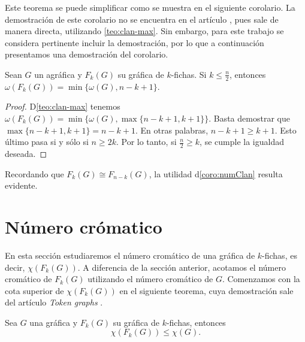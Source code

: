 Este teorema se puede simplificar como se muestra en el siguiente corolario. La
demostraci\'on de este corolario no se encuentra en el art\'iculo
\cite{fabilaToken}, pues sale de manera directa, utilizando \cref{teo:clan-max}.
Sin embargo, para este trabajo se considera pertinente incluir la
demostraci\'on, por lo que a continuaci\'on presentamos una demostraci\'on del
corolario.

\begin{corolario}
\label{coro:numClan}
    Sean $G$ un agr\'afica y $F_k(G)$ su gr\'afica de $k$-fichas. Si $k \leq
    \frac{n}{2}$, entonces $\omega(F_k(G))= \min\{\omega(G), n-k+1\}$.
\end{corolario}

\begin{proof}
    D\cref{teo:clan-max} tenemos $\omega(F_k(G))= \min \{\omega(G), \max
    \{n-k+1,k+1\}\}$. Basta demostrar que $\max \{n-k+1, k+1\} = n-k+1$. En
    otras palabras, 
    \linebreak
    $n-k+1 \geq k+1$. Esto \'ultimo pasa si y s\'olo si $n \geq
    2k$. Por lo tanto, si $\frac{n}{2} \geq k$, se cumple la igualdad deseada.
\end{proof}

Recordando que $F_k(G) \cong F_{n-k}(G)$, la utilidad  d\cref{coro:numClan}
resulta evidente. 

\section{N\'umero cr\'omatico}%
\label{sec:num cromatico}

En esta secci\'on estudiaremos el n\'umero crom\'atico de una gr\'afica de
$k$-fichas, es decir, $\chi (F_k(G))$. A diferencia de la secci\'on anterior,
acotamos el n\'umero crom\'atico de $F_k(G)$ utilizando el n\'umero crom\'atico
de $G$. Comenzamos con la cota superior de $ \chi (F_k(G))$ en el siguiente
teorema, cuya demostraci\'on sale del art\'iculo \textit{Token graphs}
\cite{fabilaToken}.

\begin{teorema}
\label{teo:num cromatico de G y F(G)}
    Sea $G$ una gr\'afica y $F_k(G)$ su gr\'afica de $k$-fichas, entonces
    \[
        \chi(F_k(G)) \leq \chi (G).
    \]
\end{teorema}

